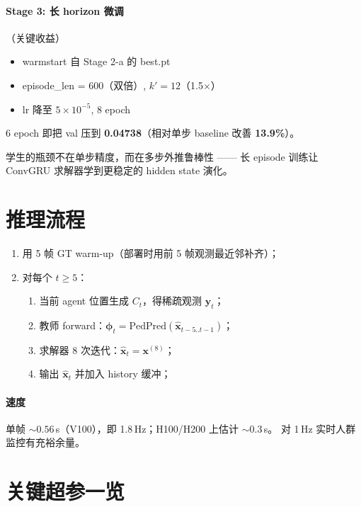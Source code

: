 \documentclass[11pt,a4paper]{ctexart}
\begin{document}
\paragraph{Stage 3: 长 horizon 微调}（关键收益）
\begin{itemize}
  \item warmstart 自 Stage 2-a 的 best.pt
  \item episode\_len = 600（双倍）, $k'=12$（1.5×）
  \item lr 降至 $5\times 10^{-5}$, 8 epoch
\end{itemize}
6 epoch 即把 val 压到 \textbf{0.04738}（相对单步 baseline 改善 \textbf{13.9\%}）。

学生的瓶颈不在单步精度，而在多步外推鲁棒性 —— 长 episode 训练让 ConvGRU 求解器学到更稳定的 hidden state 演化。

\section{推理流程}

\begin{enumerate}
  \item 用 5 帧 GT warm-up（部署时用前 5 帧观测最近邻补齐）；
  \item 对每个 $t \ge 5$：
    \begin{enumerate}
      \item 当前 agent 位置生成 $C_t$，得稀疏观测 $\mathbf{y}_t$；
      \item 教师 forward：$\boldsymbol{\phi}_t = \mathrm{PedPred}(\hat{\mathbf{x}}_{t-5..t-1})$；
      \item 求解器 8 次迭代：$\hat{\mathbf{x}}_t = \mathbf{x}^{(8)}$；
      \item 输出 $\hat{\mathbf{x}}_t$ 并加入 history 缓冲；
    \end{enumerate}
\end{enumerate}

\paragraph{速度} 单帧 $\sim 0.56$\,s（V100），即 1.8\,Hz；H100/H200 上估计 $\sim 0.3$\,s。
对 1\,Hz 实时人群监控有充裕余量。

\section{关键超参一览}
\end{document}
